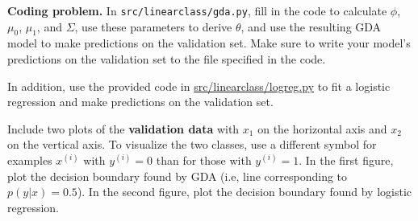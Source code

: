 \item {} \textbf{Coding problem.}
In \texttt{src/linearclass/gda.py}, fill in the code to
calculate $\phi$, $\mu_{0}$, $\mu_{1}$, and $\Sigma$, use these parameters
to derive $\theta$, and use the resulting GDA model to make predictions on the
validation set. Make sure to write your model's predictions on
the validation set to the file specified in the code.

In addition, use the provided code in \url{src/linearclass/logreg.py} to fit a logistic regression and make predictions on the validation set.

Include two plots of the \textbf{validation data} with $x_1$ on the horizontal axis and $x_2$ on the vertical axis.
To visualize the two classes, use a different symbol for examples $x^{(i)}$
with $y^{(i)} = 0$ than for those with $y^{(i)} = 1$. In the first figure, plot the decision boundary
found by GDA (i.e, line corresponding to $p(y|x) = 0.5$). In the second figure, plot the decision boundary found by logistic regression.



